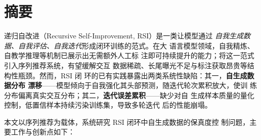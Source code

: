 \chapter*{摘要}
递归自改进（Recursive Self-Improvement, RSI）是一类让模型通过
\emph{自我生成数据、自我评估、自我迭代}形成闭环训练的范式。在大
语言模型领域，自我精炼、自教学推理等机制已展示出无需额外人工标
注即可持续提升的能力；将这一范式引入序列推荐系统，有望缓解交互
数据稀疏、长尾曝光不足与标注获取昂贵等结构性瓶颈。然而，RSI 闭
环的已有实践暴露出两类系统性缺陷：其一，\textbf{自生成数据分布
漂移}——模型倾向于自我强化其头部预测，随迭代轮次累积放大，使训
练分布偏离真实交互分布；其二，\textbf{迭代误差累积}——缺少对自
生成样本质量的量化控制，低置信样本持续污染训练集，导致多轮迭代
后的性能崩塌。

本文以序列推荐为载体，系统研究 RSI 闭环中自生成数据的保真度控
制问题，主要工作与创新点如下：

